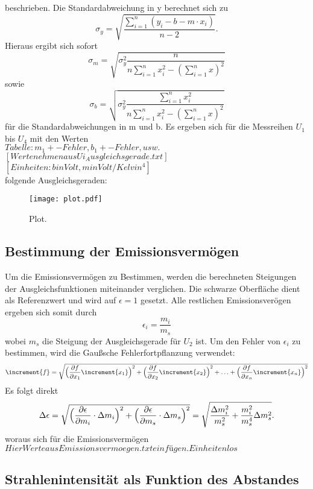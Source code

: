 beschrieben.
Die Standardabweichung in y berechnet sich zu
\begin{equation}
  \sigma_y = \sqrt{ \frac {\sum_{i=1}^n (y_i-b-m \cdot x_i)}{n-2} }.
\end{equation}
Hieraus ergibt sich sofort
\begin{equation}
  \sigma_m = \sqrt{ \sigma_y^2 \frac{n}{n \sum_{i=1}^n x_i^2 - (\sum_{i=1}^n x)^2} }
\end{equation}
sowie
\begin{equation}
  \sigma_b = \sqrt{ \sigma_y^2 \frac{\sum_{i=1}^n x_i^2}{n \sum_{i=1}^n x_i^2 - (\sum_{i=1}^n x)^2} }
\end{equation}
für die Standardabweichungen in m und b.
Es ergeben sich für die Messreihen $U_1$ bis $U_4$ mit den Werten
\\
$Tabelle: m_1 +- Fehler, b_1 +- Fehler, usw.$
$[Werte nehmen aus Ui_Ausgleichsgerade.txt]$
$[Einheiten: b in Volt, m in Volt/Kelvin^4]$
\\
folgende Ausgleichsgeraden:
\begin{figure}[H]
  \centering
  \texttt{[image: plot.pdf]}
  \caption{Plot.}
  \label{fig:plot}
\end{figure}

\cite{fehler}
\subsection{Bestimmung der Emissionsvermögen}
Um die Emissionsvermögen zu Bestimmen, werden die berechneten Steigungen der Ausgleichsfunktionen miteinander verglichen.
Die schwarze Oberfläche dient als Referenzwert und wird auf $\epsilon=1$ gesetzt.
Alle restlichen Emissionsverögen ergeben sich somit durch
\begin{equation}
  \epsilon_i = \frac{m_i}{m_s}
\end{equation}
wobei $m_s$ die Steigung der Ausgleichsgerade für $U_2$ ist.
Um den Fehler von $\epsilon_i$ zu bestimmen, wird die Gaußsche Fehlerfortpflanzung verwendet:
\begin{equation}
\increment{f} = \sqrt{\Bigl(\frac{\partial f}{\partial x_1}\increment{x_1}\Bigr)^2 + \Bigl(\frac{\partial f}{\partial x_2}\increment{x_2}\Bigr)^2 + \dotsc + \Bigl(\frac{\partial f}{\partial x_n}\increment{x_n}\Bigr)^2}
\end{equation}
Es folgt direkt
\begin{equation}
  \Delta\epsilon = \sqrt{ \Bigl( \frac{\partial \epsilon}{\partial m_i} \cdot \Delta m_i \Bigr)^2 +  \Bigl( \frac{\partial \epsilon}{\partial m_s} \cdot \Delta m_s  \Bigr)^2 } = \sqrt{ \frac{\Delta m_i ^2}{m_s^2} + \frac{m_i^2}{m_s^4} \Delta m_s^2 } .
\end{equation}
woraus sich für die Emissionsvermögen
\\
$Hier Werte aus Emissionsvermoegen.txt einfügen. Einheitenlos $
\\
\subsection{Strahlenintensität als Funktion des Abstandes}
